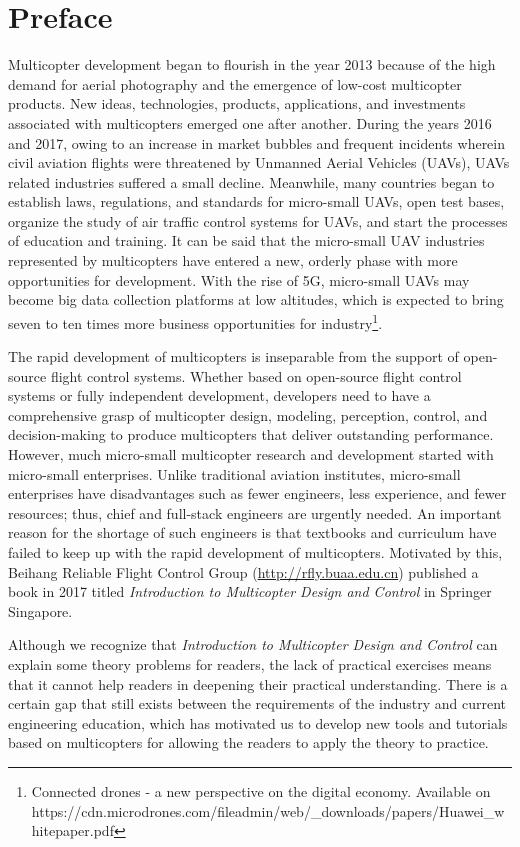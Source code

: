 
\chapter*{Preface}

Multicopter development began to flourish in the year 2013 because
of the high demand for aerial photography and the emergence of low-cost
multicopter products. New ideas, technologies, products, applications,
and investments associated with multicopters emerged one after another.
During the years 2016 and 2017, owing to an increase in market bubbles
and frequent incidents wherein civil aviation flights were threatened
by Unmanned Aerial Vehicles (UAVs), UAVs related industries suffered
a small decline. Meanwhile, many countries began to establish laws,
regulations, and standards for micro-small UAVs, open test bases,
organize the study of air traffic control systems for UAVs, and start
the processes of education and training. It can be said that the micro-small
UAV industries represented by multicopters have entered a new, orderly
phase with more opportunities for development. With the rise of 5G,
micro-small UAVs may become big data collection platforms at low altitudes,
which is expected to bring seven to ten times more business opportunities
for industry\footnote{Connected drones - a new perspective on the digital economy. Available
on https://cdn.microdrones.com/fileadmin/web/\_downloads/papers/Huawei\_whitepaper.pdf}.

The rapid development of multicopters is inseparable from the support
of open-source flight control systems. Whether based on open-source
flight control systems or fully independent development, developers
need to have a comprehensive grasp of multicopter design, modeling,
perception, control, and decision-making to produce multicopters that
deliver outstanding performance. However, much micro-small multicopter
research and development started with micro-small enterprises. Unlike
traditional aviation institutes, micro-small enterprises have disadvantages
such as fewer engineers, less experience, and fewer resources; thus,
chief and full-stack engineers are urgently needed. An important reason
for the shortage of such engineers is that textbooks and curriculum
have failed to keep up with the rapid development of multicopters.
Motivated by this, Beihang Reliable Flight Control Group (\url{http://rfly.buaa.edu.cn})
published a book in 2017 titled \textit{Introduction to Multicopter
Design and Control} in Springer Singapore.

Although we recognize that \textit{Introduction to Multicopter Design
and Control} can explain some theory problems for readers, the lack
of practical exercises means that it cannot help readers in deepening
their practical understanding. There is a certain gap that still exists
between the requirements of the industry and current engineering education,
which has motivated us to develop new tools and tutorials based on
multicopters for allowing the readers to apply the theory to practice.

